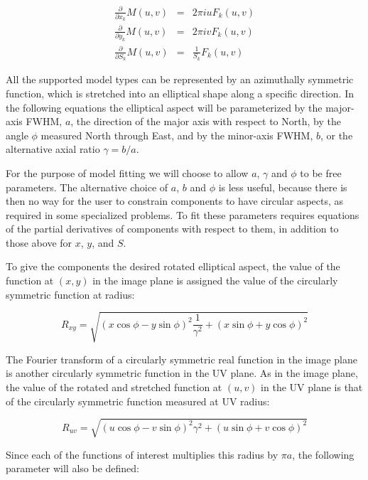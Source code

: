 \documentclass[11pt]{article}
\begin{document}
\begin{eqnarray}
\frac{\partial}{\partial x_{k}} M(u,v) & = & 2 \pi i u F_{k}(u,v) \\
%
\frac{\partial}{\partial y_{k}} M(u,v) & = & 2 \pi i v F_{k}(u,v) \\
%
\frac{\partial}{\partial S_{k}} M(u,v) & = & \frac{1}{S_{k}} F_{k}(u,v)
\end{eqnarray}

All the supported model types can be represented by an azimuthally
symmetric function, which is stretched into an elliptical shape along
a specific direction. In the following equations the elliptical aspect
will be parameterized by the major-axis FWHM, $a$, the
direction of the major axis with respect to North, by the angle $\phi$
measured North through East, and by the minor-axis FWHM, $b$,
or the alternative axial ratio $\gamma = b/a$.

For the purpose of model fitting we will choose to allow $a$, $\gamma$
and $\phi$ to be free parameters. The alternative choice of $a$,
$b$ and $\phi$ is less useful, because there is then no way for the
user to constrain components to have circular aspects, as required in
some specialized problems. To fit these parameters requires equations
of the partial derivatives of components with respect to them, in
addition to those above for $x$, $y$, and $S$.

To give the components the desired rotated elliptical aspect, the
value of the function at $(x,y)$ in the image plane is assigned the
value of the circularly symmetric function at radius:

\begin{equation}
R_{xy} = \sqrt{(x\cos{\phi}-y\sin{\phi})^{2}\frac{1}{\gamma^{2}} + (x\sin{\phi}+y\cos{\phi})^{2}}
\end{equation}

The Fourier transform of a circularly symmetric real function in the
image plane is another circularly symmetric function in the UV plane.
As in the image plane, the value of the rotated and stretched
function at $(u,v)$ in the UV plane is that of the circularly
symmetric function measured at UV radius:

\begin{equation}
R_{uv} = \sqrt{(u\cos{\phi}-v\sin{\phi})^{2}\gamma^{2}+(u\sin{\phi}+v\cos{\phi})^{2}}
\end{equation}

Since each of the functions of interest multiplies this radius by
$\pi a$, the following parameter will also be defined:
\end{document}
